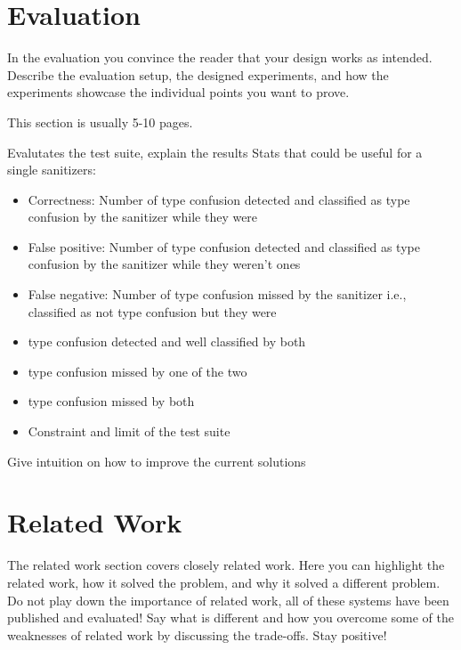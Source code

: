 \documentclass[a4paper,11pt,oneside]{report}
\begin{document}
\chapter{Evaluation}

In the evaluation you convince the reader that your design works as intended.
Describe the evaluation setup, the designed experiments, and how the
experiments showcase the individual points you want to prove.

This section is usually 5-10 pages.

Evalutates the test suite, explain the results
Stats that could be useful for a single sanitizers:
\begin{itemize}
       \item Correctness: Number of type confusion detected and classified as type confusion by the sanitizer while they were
       \item False positive: Number of type confusion detected and classified as type confusion by the sanitizer while they weren't ones
       \item False negative: Number of type confusion missed by the sanitizer i.e., classified as not type confusion but they were

       \item type confusion detected and well classified by both
       \item type confusion missed by one of the two
       \item type confusion missed by both

       \item Constraint and limit of the test suite

\end{itemize}

Give intuition on how to improve the current solutions

\chapter{Related Work}

The related work section covers closely related work. Here you can highlight
the related work, how it solved the problem, and why it solved a different
problem. Do not play down the importance of related work, all of these
systems have been published and evaluated! Say what is different and how
you overcome some of the weaknesses of related work by discussing the 
trade-offs. Stay positive!
\end{document}
